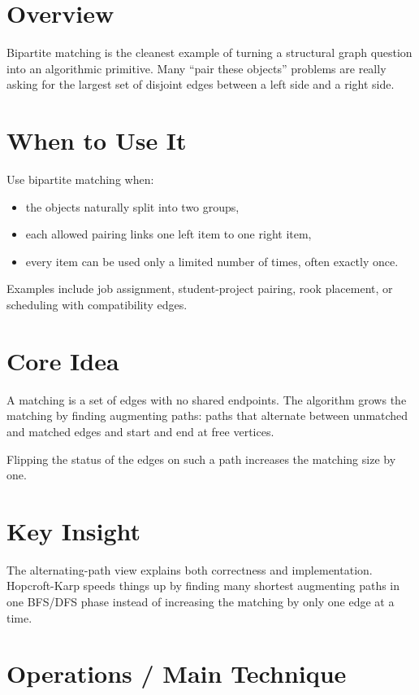 \section*{Overview}

Bipartite matching is the cleanest example of turning a structural graph question into an algorithmic primitive. Many
``pair these objects'' problems are really asking for the largest set of disjoint edges between a left side and a right
side.

\section*{When to Use It}

Use bipartite matching when:

\begin{itemize}
  \item the objects naturally split into two groups,
  \item each allowed pairing links one left item to one right item,
  \item every item can be used only a limited number of times, often exactly once.
\end{itemize}

Examples include job assignment, student-project pairing, rook placement, or scheduling with compatibility edges.

\section*{Core Idea}

A matching is a set of edges with no shared endpoints. The algorithm grows the matching by finding augmenting paths:
paths that alternate between unmatched and matched edges and start and end at free vertices.

Flipping the status of the edges on such a path increases the matching size by one.

\section*{Key Insight}

The alternating-path view explains both correctness and implementation. Hopcroft-Karp speeds things up by finding many
shortest augmenting paths in one BFS/DFS phase instead of increasing the matching by only one edge at a time.

\section*{Operations / Main Technique}

